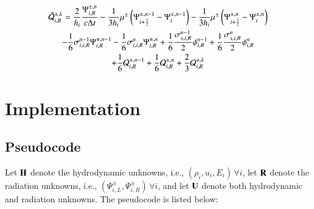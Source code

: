 \documentclass[preprint,12pt]{elsarticle}
\begin{document}
\begin{multline}
  \tilde{\mathcal{Q}}_{i,R}^{\pm,k}
  = \frac{2}{h_i}\frac{\Psi_{i,R}^{\pm,n}}{c\Delta t}
  - \frac{1}{3h_i}\mu^\pm\left( \Psi_{i+\frac{1}{2}}^{\pm,n-1} - \Psi_i^{\pm,n-1} \right)
  - \frac{1}{3h_i}\mu^\pm\left( \Psi_{i+\frac{1}{2}}^{\pm,n}   - \Psi_i^{\pm,n} \right)\\
  - \frac{1}{6}\sigma_{t,i,R}^{n-1}\Psi_{i,R}^{\pm,n-1}
  - \frac{1}{6}\sigma_{t,i,R}^n    \Psi_{i,R}^{\pm,n}
  + \frac{1}{6}\frac{\sigma_{s,i,R}^{n-1}}{2}\phi_{i,R}^{n-1}
  + \frac{1}{6}\frac{\sigma_{s,i,R}^n}{2}    \phi_{i,R}^n\\
  + \frac{1}{6}\mathcal{Q}_{i,R}^{\pm,n-1}
  + \frac{1}{6}\mathcal{Q}_{i,R}^{\pm,n}
  + \frac{2}{3}\mathcal{Q}_{i,R}^{\pm,k}
\end{multline}

\section{Implementation}
\subsection{Pseudocode}
Let $\mathbf{H}$ denote the hydrodynamic unknowns, i.e., $(\rho_i,u_i,E_i)\,\forall i$,
let $\mathbf{R}$ denote the radiation unknowns, i.e., $(\Psi_{i,L}^\pm,\Psi_{i,R}^\pm)
\,\forall i$, and let $\mathbf{U}$ denote both hydrodynamic and radiation
unknowns. The pseudocode is listed below:
\end{document}
